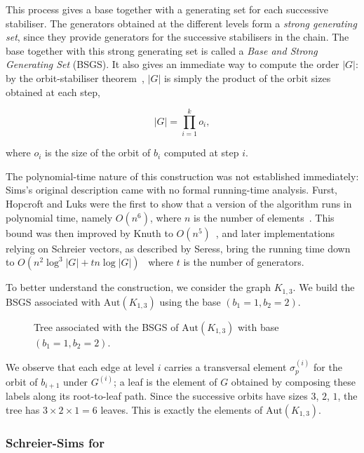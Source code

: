 This process gives a base together with a generating set for each successive stabiliser. The generators obtained at the different levels form a \emph{strong generating set}, since they provide generators for the successive stabilisers in the chain. The base together with this strong generating set is called a \emph{Base and Strong Generating Set} (BSGS). It also gives an immediate way to compute the order $|G|$: by the orbit-stabiliser theorem~\cite{enwiki:1302556046}, $|G|$ is simply the product of the orbit sizes obtained at each step,

\[
|G| = \prod_{i=1}^{k} o_i,
\]

where $o_i$ is the size of the orbit of $b_i$ computed at step $i$.

The polynomial-time nature of this construction was not established
immediately: Sims's original description came with no formal running-time
analysis. Furst, Hopcroft and Luks were the first to show that a version
of the algorithm runs in polynomial time, namely $O(n^6)$, where
$n$ is the number of elements~\cite{4567802}. This
bound was then improved by Knuth to $O(n^5)$~\cite{knuth1991efficientrepresentationpermgroups}, and
later implementations relying on Schreier vectors, as described by
Seress, bring the running time down to $O(n^2 \log^3 |G| + tn \log |G|)$~\cite{Seress2003} where $t$ is the number of generators.

To better understand the construction, we consider the graph $K_{1,3}$. We
build the BSGS associated with $\mathrm{Aut}(K_{1,3})$ using the base
$(b_1=1,b_2=2)$.



\begin{figure}[ht]
  \centering
  \resizebox{\textwidth}{!}{%
  }
  \caption{Tree associated with the BSGS of $\mathrm{Aut}(K_{1,3})$ with base $(b_1=1,b_2=2)$.}
\end{figure}

We observe that each edge at level $i$ carries a transversal element $\sigma_p^{(i)}$ for the
orbit of $b_{i+1}$ under $G^{(i)}$; a leaf is the element of $G$ obtained by
composing these labels along its root-to-leaf path. Since the successive
orbits have sizes $3$, $2$, $1$, the tree has $3 \times 2 \times 1 = 6$
leaves. This is exactly the elements of $\mathrm{Aut}(K_{1,3})$.


\subsubsection{Schreier-Sims for \Naut{}}

